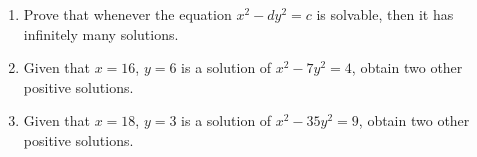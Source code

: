 \begin{exercise}
    \begin{enumerate}
        \item Prove that whenever the equation $x^2 - dy^2 = c$ is solvable, then it has infinitely many solutions. 
        \item Given that $x = 16$, $y = 6$ is a solution of $x^2 - 7y^2 = 4$, obtain two other positive solutions.
        \item Given that $x = 18$, $y = 3$ is a solution of $x^2 - 35y^2 = 9$, obtain two other positive solutions. \\
    \end{enumerate}
\end{exercise}

